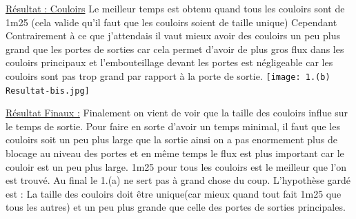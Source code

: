 \documentclass[12pt]{article}
\begin{document}
\underline{Résultat : Couloirs}
\newline
Le meilleur temps est obtenu quand tous les couloirs sont de 1m25 (cela valide qu'il faut que les couloirs soient de taille unique)
\newline
Cependant Contrairement à ce que j'attendais il vaut mieux avoir des couloirs un peu plus grand que les portes de sorties car cela permet d'avoir de plus gros flux
dans les couloirs principaux et l'embouteillage devant les portes est négligeable car les couloirs sont pas trop grand par rapport à la porte de sortie.
\newline
\texttt{[image: 1.(b) Resultat-bis.jpg]}\newline
\newline\newline

\underline{Résultat Finaux :}
\newline
Finalement on vient de voir que la taille des couloirs influe sur le temps de sortie. Pour faire en sorte d'avoir un temps minimal, il faut que les couloirs soit un peu plus large que la sortie
ainsi on a pas enormement plus de blocage au niveau des portes et en même temps le flux est plus important car le couloir est un peu plus large.
1m25 pour tous les couloirs est le meilleur que l'on est trouvé.
\newline
Au final le 1.(a) ne sert pas à grand chose du coup.
\newline\newline
L'hypothèse gardé est : La taille des couloirs doit être unique(car mieux quand tout fait 1m25 que tous les autres) et un peu plus grande que celle des portes de sorties principales.
\end{document}
